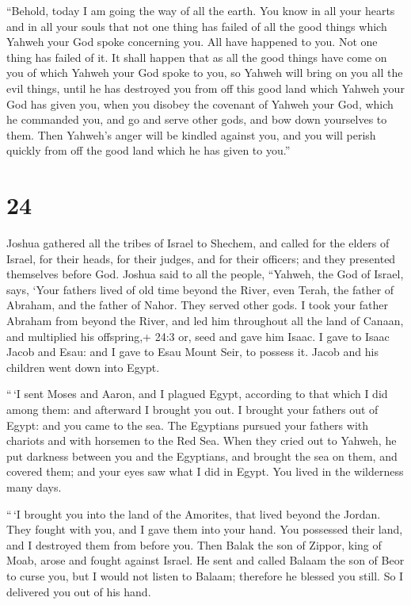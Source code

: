  ``Behold, today I am going the way of all the earth. You
know in all your hearts and in all your souls that not one thing has
failed of all the good things which Yahweh your God spoke concerning
you. All have happened to you. Not one thing has failed of it.
 It shall happen that as all the good things have come on
you of which Yahweh your God spoke to you, so Yahweh will bring on you
all the evil things, until he has destroyed you from off this good land
which Yahweh your God has given you,  when you disobey the
covenant of Yahweh your God, which he commanded you, and go and serve
other gods, and bow down yourselves to them. Then Yahweh's anger will be
kindled against you, and you will perish quickly from off the good land
which he has given to you.''

\hypertarget{section-23}{%
\section{24}\label{section-23}}

 Joshua gathered all the tribes of Israel to Shechem, and
called for the elders of Israel, for their heads, for their judges, and
for their officers; and they presented themselves before God.
 Joshua said to all the people, ``Yahweh, the God of Israel,
says, `Your fathers lived of old time beyond the River, even Terah, the
father of Abraham, and the father of Nahor. They served other gods.
 I took your father Abraham from beyond the River, and led
him throughout all the land of Canaan, and multiplied his offspring,+
24:3 or, seed and gave him Isaac.  I gave to Isaac Jacob and
Esau: and I gave to Esau Mount Seir, to possess it. Jacob and his
children went down into Egypt.

 ``\,`I sent Moses and Aaron, and I plagued Egypt, according
to that which I did among them: and afterward I brought you out.
 I brought your fathers out of Egypt: and you came to the
sea. The Egyptians pursued your fathers with chariots and with horsemen
to the Red Sea.  When they cried out to Yahweh, he put
darkness between you and the Egyptians, and brought the sea on them, and
covered them; and your eyes saw what I did in Egypt. You lived in the
wilderness many days.

 ``\,`I brought you into the land of the Amorites, that
lived beyond the Jordan. They fought with you, and I gave them into your
hand. You possessed their land, and I destroyed them from before you.
 Then Balak the son of Zippor, king of Moab, arose and
fought against Israel. He sent and called Balaam the son of Beor to
curse you,  but I would not listen to Balaam; therefore he
blessed you still. So I delivered you out of his hand.

